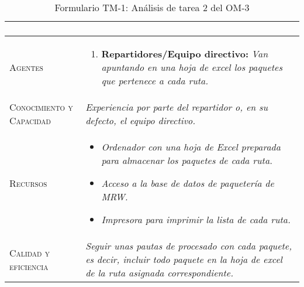 \begin{table}[H]
{\begin{tabularx}{\textwidth}{|l|X|}
\begin{enumerate}
				\end{enumerate} \\
			\hline
			\textsc{Agentes} & 
				\begin{enumerate}
					\item \textbf{Repartidores/Equipo directivo:} \textit{Van apuntando en una hoja de excel los paquetes que pertenece a cada ruta.}
				\end{enumerate} \\
			\hline
			\textsc{Conocimiento y Capacidad} & \textit{Experiencia por parte del repartidor o, en su defecto, el equipo directivo.} \\
			\hline
			\textsc{Recursos} & 
				\begin{itemize}
					\item \textit{Ordenador con una hoja de Excel preparada para almacenar los paquetes de cada ruta.}
					\item \textit{Acceso a la base de datos de paquetería de MRW.}
					\item \textit{Impresora para imprimir la lista de cada ruta.}
				\end{itemize} \\
			\hline
			\textsc{Calidad y eficiencia} & \textit{Seguir unas pautas de procesado con cada paquete, es decir, incluir todo paquete en la hoja de excel de la ruta asignada correspondiente.} \\
			\hline
		\end{tabularx}
	}
	\caption{\label{tab:TM1T2}Formulario TM-1: Análisis de tarea 2 del OM-3}
\end{table} 

